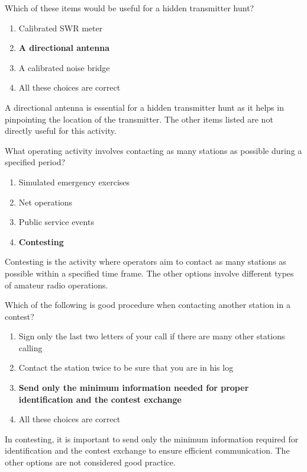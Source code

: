 
\begin{tcolorbox}[colback=gray!10!white,colframe=black!75!black,title={T8C02}]
    Which of these items would be useful for a hidden transmitter hunt?
    \begin{enumerate}[label=\Alph*),noitemsep]
        \item Calibrated SWR meter
        \item \textbf{A directional antenna}
        \item A calibrated noise bridge
        \item All these choices are correct
    \end{enumerate}
\end{tcolorbox}
A directional antenna is essential for a hidden transmitter hunt as it helps in pinpointing the location of the transmitter. The other items listed are not directly useful for this activity.


\begin{tcolorbox}[colback=gray!10!white,colframe=black!75!black,title={T8C03}]
    What operating activity involves contacting as many stations as possible during a specified period?
    \begin{enumerate}[label=\Alph*),noitemsep]
        \item Simulated emergency exercises
        \item Net operations
        \item Public service events
        \item \textbf{Contesting}
    \end{enumerate}
\end{tcolorbox}
Contesting is the activity where operators aim to contact as many stations as possible within a specified time frame. The other options involve different types of amateur radio operations.


\begin{tcolorbox}[colback=gray!10!white,colframe=black!75!black,title={T8C04}]
    Which of the following is good procedure when contacting another station in a contest?
    \begin{enumerate}[label=\Alph*),noitemsep]
        \item Sign only the last two letters of your call if there are many other stations calling
        \item Contact the station twice to be sure that you are in his log
        \item \textbf{Send only the minimum information needed for proper identification and the contest exchange}
        \item All these choices are correct
    \end{enumerate}
\end{tcolorbox}
In contesting, it is important to send only the minimum information required for identification and the contest exchange to ensure efficient communication. The other options are not considered good practice.

